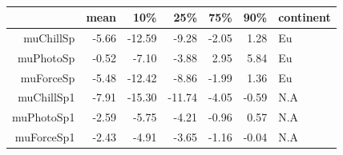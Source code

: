 \documentclass[12pt]{article}\usepackage[]{graphicx}\usepackage[]{color}
\begin{document}
\begin{table}[ht]
\centering
\begin{tabular}{rrrrrrl}
  \hline
 & mean & 10\% & 25\% & 75\% & 90\% & continent \\ 
  \hline
muChillSp & -5.66 & -12.59 & -9.28 & -2.05 & 1.28 & Eu \\ 
  muPhotoSp & -0.52 & -7.10 & -3.88 & 2.95 & 5.84 & Eu \\ 
  muForceSp & -5.48 & -12.42 & -8.86 & -1.99 & 1.36 & Eu \\ 
  muChillSp1 & -7.91 & -15.30 & -11.74 & -4.05 & -0.59 & N.A \\ 
  muPhotoSp1 & -2.59 & -5.75 & -4.21 & -0.96 & 0.57 & N.A \\ 
  muForceSp1 & -2.43 & -4.91 & -3.65 & -1.16 & -0.04 & N.A \\ 
   \hline
\end{tabular}
\caption{}
\end{table}
\end{document}
